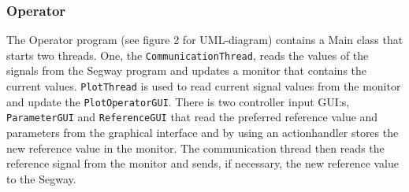 \subsubsection{Operator}
The Operator program (see figure 2 for UML-diagram)  contains a Main class that starts two threads. One, the \texttt{CommunicationThread}, reads the values of the signals from the Segway program and updates a monitor that contains the current values. \texttt{PlotThread} is used to read current signal values from the monitor and update the \texttt{PlotOperatorGUI}. There is two controller input GUI:s, \texttt{ParameterGUI} and \texttt{ReferenceGUI} that read the preferred reference value and parameters from the graphical interface and by using an actionhandler stores the new reference value in the monitor. The communication thread then reads the reference signal from the monitor and sends, if necessary, the new reference value to the Segway.


